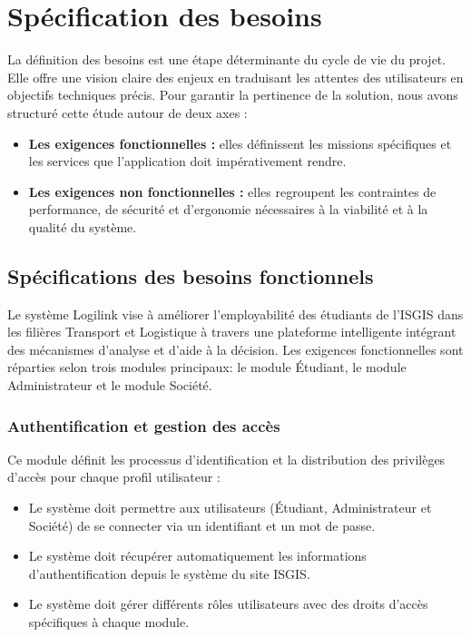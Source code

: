 \section{Spécification des besoins}

La définition des besoins est une étape déterminante du cycle de vie du projet. Elle offre une vision claire des enjeux en traduisant les attentes des utilisateurs en objectifs techniques précis. Pour garantir la pertinence de la solution, nous avons structuré cette étude autour de deux axes :

\begin{itemize}
  \item \textbf{Les exigences fonctionnelles :} elles définissent les missions spécifiques et les services que l'application doit impérativement rendre.
  \item \textbf{Les exigences non fonctionnelles :} elles regroupent les contraintes de performance, de sécurité et d'ergonomie nécessaires à la viabilité et à la qualité du système.
\end{itemize}


\subsection{Spécifications des besoins fonctionnels}

Le système Logilink vise à améliorer l’employabilité des étudiants de l’ISGIS dans les filières Transport et Logistique à travers une plateforme intelligente intégrant des mécanismes d’analyse et d’aide à la décision. Les exigences fonctionnelles sont réparties selon trois modules principaux: le module Étudiant, le module Administrateur et le module Société.




\subsubsection{Authentification et gestion des accès}

Ce module définit les processus d'identification et la distribution des privilèges d'accès pour chaque profil utilisateur :

\begin{itemize}
  \item Le système doit permettre aux utilisateurs (Étudiant, Administrateur et Société) de se connecter via un identifiant et un mot de passe.
  \item Le système doit récupérer automatiquement les informations d'authentification depuis le système du site ISGIS.
  \item Le système doit gérer différents rôles utilisateurs avec des droits d'accès spécifiques à chaque module.
\end{itemize}


